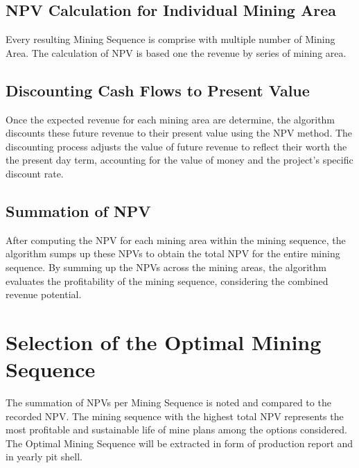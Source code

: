 \documentclass[12pt]{report}
\begin{document}
\subsection{NPV Calculation for Individual Mining Area}

Every resulting Mining Sequence is comprise with multiple number of Mining Area. 
The calculation of NPV is based one the revenue by series of mining area. 

\subsection{Discounting Cash Flows to Present Value}

Once the expected revenue for each mining area are determine, the algorithm discounts these future revenue to their present value using the NPV method.
The discounting process adjusts the value of future revenue to reflect their worth the the present day term, accounting for the value of money and the project’s specific discount rate.

\subsection{Summation of NPV}

After computing the NPV for each mining area within the mining sequence, the algorithm sumps up these NPVs to obtain the total NPV for the entire mining sequence.
By summing up the NPVs across the mining areas, the algorithm evaluates the profitability of the mining sequence, considering the combined revenue potential.

\section{Selection of the Optimal Mining Sequence}

The summation of NPVs per Mining Sequence is noted and compared to the recorded NPV.
The mining sequence with the highest total NPV represents the most profitable and sustainable life of mine plans among the options considered.
The Optimal Mining Sequence will be extracted in form of production report and in yearly pit shell.

\printbibliography[
    title = {REFERENCES},
    heading = bibintoc
]
\end{document}
